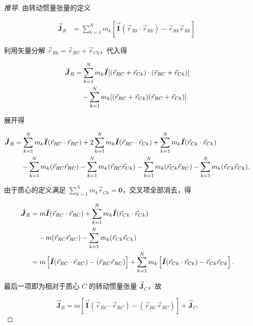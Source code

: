 \begin{proof}[推导]
由转动惯量张量的定义

\begin{align*}\vec{\boldsymbol{J}}_R &= \sum_{k=1}^{N} m_k \left[ \vec{\boldsymbol{I}} (\vec{r}_{Rk} \cdot \vec{r}_{Rk}) - \vec{r}_{Rk} \vec{r}_{Rk} \right].\end{align*}

利用矢量分解 $\vec{r}_{Rk} = \vec{r}_{RC} + \vec{r}_{Ck}$，代入得

\begin{align*}\vec{\boldsymbol{J}}_R &= \sum_{k=1}^{N} m_k \vec{\boldsymbol{I}} [(\vec{r}_{RC} + \vec{r}_{Ck}) \cdot (\vec{r}_{RC} + \vec{r}_{Ck})] \notag \\
&\quad - \sum_{k=1}^{N} m_k [(\vec{r}_{RC} + \vec{r}_{Ck})(\vec{r}_{RC} + \vec{r}_{Ck})].\end{align*}

展开得

\begin{align*}\vec{\boldsymbol{J}}_R &= \sum_{k=1}^{N} m_k \vec{\boldsymbol{I}} (\vec{r}_{RC} \cdot \vec{r}_{RC}) + 2\sum_{k=1}^{N} m_k \vec{\boldsymbol{I}} (\vec{r}_{RC} \cdot \vec{r}_{Ck}) + \sum_{k=1}^{N} m_k \vec{\boldsymbol{I}} (\vec{r}_{Ck} \cdot \vec{r}_{Ck}) \notag \\
&\quad - \sum_{k=1}^{N} m_k (\vec{r}_{RC} \vec{r}_{RC}) - \sum_{k=1}^{N} m_k (\vec{r}_{RC} \vec{r}_{Ck}) - \sum_{k=1}^{N} m_k (\vec{r}_{Ck} \vec{r}_{RC}) - \sum_{k=1}^{N} m_k (\vec{r}_{Ck} \vec{r}_{Ck}).\end{align*}

由于质心的定义满足 $\sum_{k=1}^{N} m_k \vec{r}_{Ck} = \boldsymbol{0}$，交叉项全部消去，得

\begin{align*}\vec{\boldsymbol{J}}_R &= m \vec{\boldsymbol{I}} (\vec{r}_{RC} \cdot \vec{r}_{RC}) + \sum_{k=1}^{N} m_k \vec{\boldsymbol{I}} (\vec{r}_{Ck} \cdot \vec{r}_{Ck}) \notag \\
&\quad - m (\vec{r}_{RC} \vec{r}_{RC}) - \sum_{k=1}^{N} m_k (\vec{r}_{Ck} \vec{r}_{Ck}) \notag \\
&= m \left[ \vec{\boldsymbol{I}} (\vec{r}_{RC} \cdot \vec{r}_{RC}) - (\vec{r}_{RC} \vec{r}_{RC}) \right] + \sum_{k=1}^{N} m_k \left[ \vec{\boldsymbol{I}} (\vec{r}_{Ck} \cdot \vec{r}_{Ck}) - \vec{r}_{Ck} \vec{r}_{Ck} \right].\end{align*}

最后一项即为相对于质心 $C$ 的转动惯量张量 $\vec{\boldsymbol{J}}_C$，故

\[
\vec{\boldsymbol{J}}_R = m \left[ \vec{\boldsymbol{I}} (\vec{r}_{RC} \cdot \vec{r}_{RC}) - (\vec{r}_{RC} \vec{r}_{RC}) \right] + \vec{\boldsymbol{J}}_C.
\]
\end{proof}
